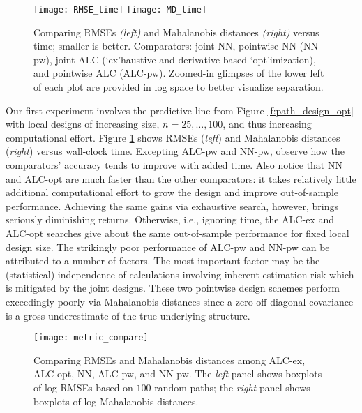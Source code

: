 \documentclass[12pt]{article}
\begin{document}
\begin{figure}[ht!]
\centering
\texttt{[image: RMSE\_time]} \hspace{0.1cm}
\texttt{[image: MD\_time]} \vspace{-0.26cm}
\caption{Comparing RMSEs {\em (left)} and Mahalanobis distances {\em (right)}
versus time; smaller is better.  Comparators: joint NN, pointwise
NN (NN-pw), joint ALC (`ex'haustive and
derivative-based `opt'imization), and pointwise ALC (ALC-pw).
Zoomed-in glimpses of the lower left of each plot are provided in log space to
better visualize separation.}
\label{f:metric_time}
\end{figure}	

Our first experiment involves the predictive line from Figure
\ref{f:path_design_opt} with local designs of increasing size, $n=25,\dots,
100$, and thus increasing computational effort. Figure \ref{f:metric_time}
shows RMSEs ({\em left}) and Mahalanobis distances ({\em right}) versus
wall-clock time. Excepting ALC-pw and NN-pw, observe how the comparators'
accuracy tends to improve with added time.   Also notice that NN and ALC-opt
are much faster than the other comparators: it takes relatively little
additional computational effort to grow the design and improve out-of-sample
performance. Achieving the same gains via exhaustive search, however, brings
seriously diminishing returns. Otherwise, i.e., ignoring time, the ALC-ex and
ALC-opt searches give about the same out-of-sample performance for fixed local
design size. The strikingly poor performance of ALC-pw and NN-pw can be
attributed to a number of factors. The most important factor may be the (statistical)
independence of calculations involving inherent estimation risk which is
mitigated by the joint designs.  These two pointwise design schemes perform
exceedingly poorly via Mahalanobis distances since a zero off-diagonal
covariance is a gross underestimate of the true underlying structure. 

\begin{figure}[ht!]
\centering
\texttt{[image: metric\_compare]}
\vspace{-0.4cm}
\caption{Comparing RMSEs and Mahalanobis distances among ALC-ex,
ALC-opt, NN, ALC-pw, and NN-pw. The {\em left} panel shows boxplots of log RMSEs
based on $100$ random paths; the {\em right} panel shows boxplots of log
Mahalanobis distances.}
\label{f:metric_compare}
\end{figure}	
\end{document}
